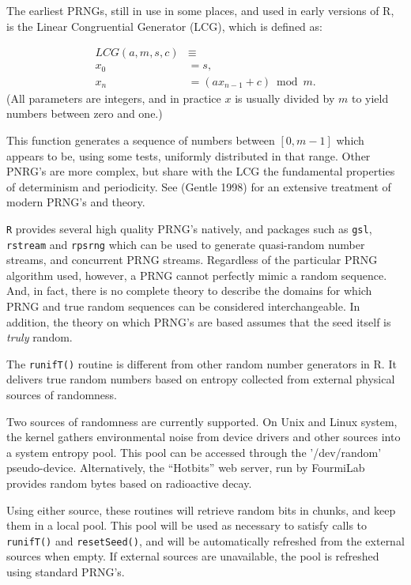 \documentclass[11pt]{article}
\begin{document}
The earliest PRNGs, still in use in some places, and used in early versions of R, is the Linear Congruential Generator (LCG), 
which is defined as:

\begin{align}\label{Congruential.Generator}
    LCG(a,m,s,c)&\equiv \nonumber\\
            x_{0} &=s,  \nonumber\\
            x_{n} &=(ax_{n-1}+c)\bmod{m}.
\end{align}
(All parameters are integers, and in practice $x$ is usually divided by $m$ to yield numbers between zero and one.) 

This function  generates a sequence of numbers between $[0,m-1]$ which appears to be, using some tests, uniformly distributed in that range.  Other PNRG's are more complex, but share with the LCG the  fundamental properties of determinism and periodicity.  See (Gentle 1998) for an extensive treatment of modern PRNG's and theory.

\texttt{R} provides several high quality PRNG's natively, and packages such as  
\texttt{gsl}, \texttt{rstream} and \texttt{rpsrng} which  can be used to generate
quasi-random number streams, and concurrent  PRNG streams.
Regardless of the particular PRNG algorithm used, however, a PRNG cannot
perfectly mimic a random sequence. And, in fact, there is no complete
theory to describe the domains for which PRNG and true random sequences 
can be considered interchangeable.  In addition, the theory
on which PRNG's are based assumes that the seed itself is \emph{truly} random.

The \texttt{runifT()} routine is different from other random number generators in R. 
It delivers true random numbers based on
entropy collected from external physical sources of randomness.

Two sources of randomness are currently supported. On Unix and Linux system, the kernel gathers environmental noise from 
device drivers and other sources into a system entropy pool.
This pool can be accessed through the '/dev/random' pseudo-device.
Alternatively, the ``Hotbits'' web server, run by FourmiLab provides random bytes based on radioactive decay.

Using either source, these routines will retrieve random bits in chunks,
 and keep them in a local pool. This pool will be used as necessary to 
 satisfy calls to \texttt{runifT()} and \texttt{resetSeed()},
  and will be automatically refreshed from the external sources when empty. 
  If external sources are unavailable, the pool is refreshed using standard PRNG's.
\end{document}
